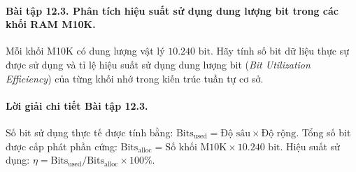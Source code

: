 \paragraph{Bài tập 12.3. Phân tích hiệu suất sử dụng dung lượng bit trong các khối RAM M10K.}
Mỗi khối M10K có dung lượng vật lý $10.240\text{ bit}$. Hãy tính số bit dữ liệu thực sự được sử dụng và tỉ lệ hiệu suất sử dụng dung lượng bit (\emph{Bit Utilization Efficiency}) của từng khối nhớ trong kiến trúc tuần tự cơ sở.

\paragraph{Lời giải chi tiết Bài tập 12.3.}
Số bit sử dụng thực tế được tính bằng: $\text{Bits}_{\text{used}} = \text{Độ sâu} \times \text{Độ rộng}$.
Tổng số bit được cấp phát phần cứng: $\text{Bits}_{\text{alloc}} = \text{Số khối M10K} \times 10.240\text{ bit}$.
Hiệu suất sử dụng: $\eta = \text{Bits}_{\text{used}} / \text{Bits}_{\text{alloc}} \times 100\%$.


